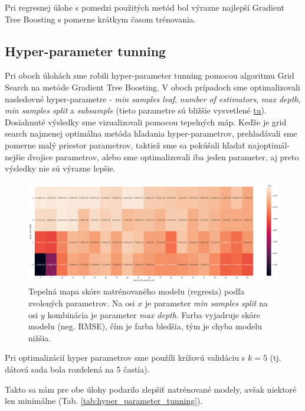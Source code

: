 \documentclass[runningheads]{llncs}
\begin{document}
Pri regresnej úlohe s pomedzi použitých metód bol výrazne najlepší Gradient Tree Boosting s pomerne krátkym časom trénovania.

\subsection{Hyper-parameter tunning}

Pri oboch úlohách sme robili hyper-parameter tunning pomocou algoritmu Grid Search na metóde Gradient Tree Boosting. V oboch prípadoch sme optimalizovali nasledovné hyper-parametre - \textit{min samples leaf}, \textit{number of estimators}, \textit{max depth}, \textit{min samples split} a \textit{subsample} (tieto parametre sú bližšie vysvetlené \href{https://scikit-learn.org/stable/modules/generated/sklearn.ensemble.GradientBoostingRegressor.html}{tu}). Dosiahnuté výsledky sme vizualizovali pomocou tepelných máp. Keďže je grid search najmenej optimálna metóda hľadania hyper-parametrov, prehladávali sme pomerne malý priestor parametrov, taktiež sme sa pokúšali hľadať najoptimál-nejšie dvojice parametrov, alebo sme optimalizovali iba jeden parameter, aj preto výsledky nie sú výrazne lepšie.

\begin{figure}[htp]
    \centering
    \includegraphics[height=4.5cm]{images/hyper_parameter_tunning}
    \caption{Tepelná mapa skóre natrénovaného modelu (regresia) podľa zvolených parametrov. Na osi $x$ je parameter \textit{min samples split} na osi $y$ kombinácia je parameter \textit{max depth}. Farba vyjadruje skóre modelu (neg. RMSE), čím je farba bledšia, tým je chyba modelu nižšia.}
    \label{fig:hyper_parameter_tunning}
\end{figure}
 
Pri optimalizácií hyper parametrov sme použíli krížovú validáciu s $k=5$ (tj. dátová sada bola rozdelená na 5 častía).

Takto sa nám pre obe úlohy podarilo zlepšiť natrénované modely, avšak niektoré len minimálne (Tab. \ref{tab:hyper_parameter_tunning}).
\end{document}
